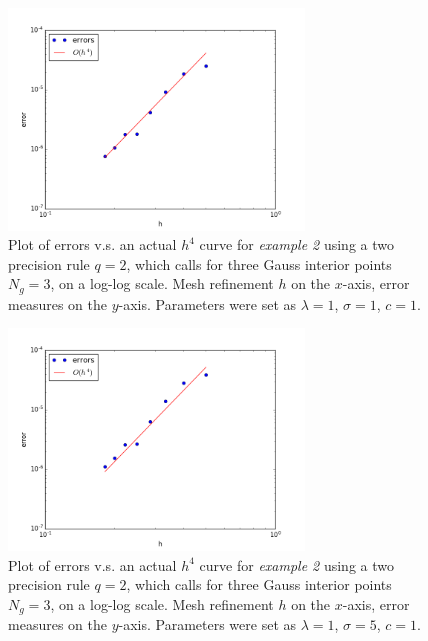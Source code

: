 \documentclass{uonmathreport}
\begin{document}
\begin{figure}[H]
	\begin{center}
		\includegraphics[width=0.7\textwidth]{Figures/2dTriTest2_case1.png}
	\end{center}
	\caption{Plot of errors v.s. an actual $h^4$ curve for \textit{example 2} using a two precision rule $q=2$, which calls for three Gauss interior points $N_g=3$, on a log-log scale. Mesh refinement $h$ on the $x$-axis, error measures on the $y$-axis. Parameters were set as $\lambda=1$, $\sigma=1$, $c=1$.}
	\label{fig:2dTri_Errors_test2_case1}
\end{figure}

\begin{figure}[H]
	\begin{center}
		\includegraphics[width=0.7\textwidth]{Figures/2dTriTest2_case2.png}
	\end{center}
	\caption{Plot of errors v.s. an actual $h^4$ curve for \textit{example 2} using a two precision rule $q=2$, which calls for three Gauss interior points $N_g=3$, on a log-log scale. Mesh refinement $h$ on the $x$-axis, error measures on the $y$-axis. Parameters were set as $\lambda=1$, $\sigma=5$, $c=1$.}
	\label{fig:2dTri_Errors_test2_case2}
\end{figure}
\end{document}
